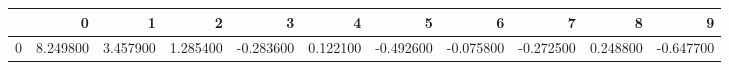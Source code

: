 \begin{tabular}{lrrrrrrrrrr}
\toprule
 & 0 & 1 & 2 & 3 & 4 & 5 & 6 & 7 & 8 & 9 \\
\midrule
0 & 8.249800 & 3.457900 & 1.285400 & -0.283600 & 0.122100 & -0.492600 & -0.075800 & -0.272500 & 0.248800 & -0.647700 \\
\bottomrule
\end{tabular}
